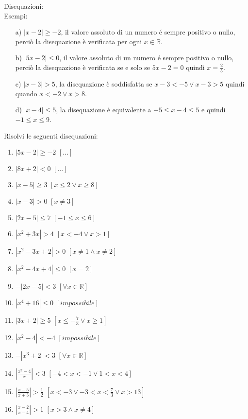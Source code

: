 Disequazioni:\\
Esempi:
\begin{enumerate}
        \item[a)] $|x-2|\geq -2$, il valore assoluto di un numero é sempre 
positivo o nullo, perciò la disequazione è verificata per ogni $x\in 
\mathbb{R}$.

        \item[b)] $|5x-2|\leq 0$, il valore assoluto di un numero é sempre 
positivo o nullo, perciò la disequazione è verificata se e solo se $5x-2=0$ 
quindi $x=\frac{2}{5}$.
        \item[c)] $|x-3|>5$, la disequazione è soddisfatta se $x-3<-5 \vee 
x-3>5$ quindi quando $x<-2 \vee x>8$.
        \item[d)] $|x-4|\leq 5$, la disequazione è equivalente a $-5\leq x-4 
\leq 5$ e quindi $-1\leq x \leq 9$.
\end{enumerate}

Risolvi le seguenti disequazioni:

\begin{enumerate}
\item $\left| 5x-2\right| \geq -2 $ \hfill $\left[ \dots \right] $
\item $\left| 8x+2\right| < 0 $ \hfill $\left[ \dots \right] $
\item $\left| x-5\right| \geq 3 $ \hfill $\left[ x\leq 2 \vee x\geq 8 \right] $
\item $\left| x-3\right| >0 $ \hfill $\left[ x\neq 3 \right] $
\item $\left| 2x-5\right| \leq 7 $ \hfill $\left[ -1\leq x \leq 6 \right] $
\item $\left| x^2+3x\right| >4 $ \hfill $\left[ x<-4 \vee x>1 \right] $
\item $\left| x^2-3x+2\right| >0 $ \hfill $\left[ x\neq 1 \wedge x\neq 2 \right] 
$
\item $\left| x^2-4x+4\right| \leq 0 $ \hfill $\left[ x=2 \right] $
\item $-\left| 2x-5\right| <3 $ \hfill $\left[ \forall x \in \mathbb{R} \right] 
$
\item $\left| x^4+16\right| \leq 0 $ \hfill $\left[ impossibile \right] $
\item $\left| 3x+2\right| \geq 5 $ \hfill $\left[ x\leq -\frac{7}{3} \vee x\geq 
1 \right] $
\item $\left| x^2-4\right| <-4 $ \hfill $\left[ impossibile \right] $
\item $-\left| x^3+2\right| <3 $ \hfill $\left[ \forall x \in \mathbb{R} \right] 
$
\item $\left| \frac{x^2-4}{x}\right| <3 $ \hfill $\left[ -4<x<-1 \vee 1<x<4 
\right] $
\item $\left| \frac{x-5}{x+3}\right| >\frac{1}{2} $ \hfill $\left[x<-3 \vee 
-3<x<\frac{7}{3} \vee x>13 \right] $
\item $\left| \frac{x-2}{x-4}\right| >1 $ \hfill $\left[x>3 \wedge x \neq 4 
\right] $
\end{enumerate}


